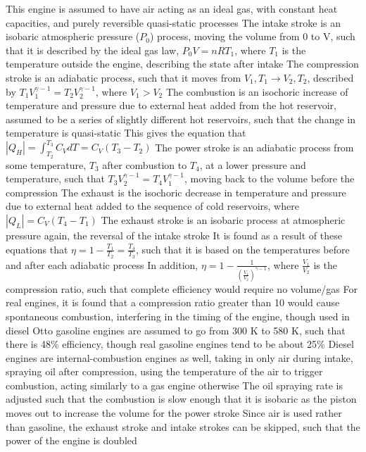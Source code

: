 \documentclass[11 pt, twoside]{article}
\newenvironment{outline*}
{
	\begin{outline}[enumerate]
	}
	{\end{outline}
}
\begin{document}
\begin{outline*}
\2 This engine is assumed to have air acting as an ideal gas, with constant heat capacities, and purely reversible quasi-static processes
\2 The intake stroke is an isobaric atmospheric pressure ($P_0$) process, moving the volume from 0 to V, such that it is described by the ideal gas law, $P_0V = nRT_1$, where $T_1$ is the temperature outside the engine, describing the state after intake
\2 The compression stroke is an adiabatic process, such that it moves from $V_1, T_1 \to V_2, T_2$, described by $T_1V_1^{\gamma - 1} = T_2V_2^{\gamma - 1}$, where $V_1 > V_2$
\2 The combustion is an isochoric increase of temperature and pressure due to external heat added from the hot reservoir, assumed to be a series of slightly different hot reservoirs, such that the change in temperature is quasi-static
\3 This gives the equation that $|Q_H| = \int^{T_3}_{T_2}C_VdT = C_V(T_3 - T_2)$
\2 The power stroke is an adiabatic process from some temperature, $T_3$ after combustion to $T_4$, at a lower pressure and temperature, such that $T_3V_2^{\gamma - 1} = T_4V_1^{\gamma - 1}$, moving back to the volume before the compression
\2 The exhaust is the isochoric decrease in temperature and pressure due to external heat added to the sequence of cold reservoirs, where $|Q_L| = C_V(T_4 - T_1)$
\2 The exhaust stroke is an isobaric process at atmospheric pressure again, the reversal of the intake stroke
\2 It is found as a result of these equations that $\eta = 1 - \frac{T_1}{T_2} = \frac{T_4}{T_3}$, such that it is based on the temperatures before and after each adiabatic process
\3 In addition, $\eta = 1 - \frac{1}{(\frac{V_1}{V_2})^{\gamma - 1}}$, where $\frac{V_1}{V_2}$ is the compression ratio, such that complete efficiency would require no volume/gas
\4 For real engines, it is found that a compression ratio greater than 10 would cause spontaneous combustion, interfering in the timing of the engine, though used in diesel
\3 Otto gasoline engines are assumed to go from 300 K to 580 K, such that there is 48\% efficiency, though real gasoline engines tend to be about 25\%
\1 Diesel engines are internal-combustion engines as well, taking in only air during intake, spraying oil after compression, using the temperature of the air to trigger combustion, acting similarly to a gas engine otherwise
\2 The oil spraying rate is adjusted such that the combustion is slow enough that it is isobaric as the piston moves out to increase the volume for the power stroke
\2 Since air is used rather than gasoline, the exhaust stroke and intake strokes can be skipped,  such that the power of the engine is doubled

\end{outline*}
\end{document}
